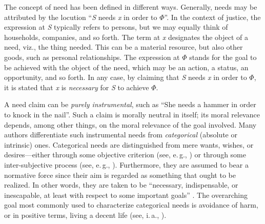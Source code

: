 \documentclass[10pt,letterpaper]{article}
\begin{document}
The concept of need has been defined in different ways.
Generally, needs may be attributed by the locution ``\textit{S} needs \textit{x} in order to $\Phi$''.
In the context of justice, the expression at \textit{S} typically refers to persons, but we may equally think of households, companies, and so forth.
The term at \textit{x} designates the object of a need, viz., the thing needed.
This can be a material resource, but also other goods, such as personal relationships.
The expression at $\Phi$ stands for the goal to be achieved with the object of the need, which may be an action, a status, an opportunity, and so forth.
In any case, by claiming that \textit{S} needs \textit{x} in order to $\Phi$, it is stated that \textit{x} is \textit{necessary} for \textit{S} to achieve $\Phi$.

A need claim can be \textit{purely instrumental}, such as ``She needs a hammer in order to knock in the nail''.
Such a claim is morally neutral in itself; its moral relevance depends, among other things, on the moral relevance of the goal involved.
Many authors differentiate such instrumental needs from \textit{categorical} (absolute or intrinsic) ones.
Categorical needs are distinguished from mere wants, wishes, or desires---either through some objective criterion (see, e.\,g., \cite{brock_needs_2005,thomson_fundamental_2005,weale_needs_1998,wringe_needs_2005}) or through some inter-subjective process (see, e.\,g., \cite{kelsen_was_2016,hamilton_political_2003,miller_principles_1999}). 
Furthermore, they are assumed to bear a normative force since their aim is regarded as something that ought to be realized.
In other words, they are taken to be ``necessary, indispensable, or inescapable, at least with respect to some important goals'' \cite[par. 37]{brock_needs_2019}.
The overarching goal most commonly used to characterize categorical needs is avoidance of harm, or in positive terms, living a decent life (see, i.\,a., \cite{frankfurt_necessity_1984,miller_social_1976,miller_principles_1999,thomson_need_1987,thomson_fundamental_2005,wiggins_needs_1987,wiggins_what_1998}).
\end{document}
